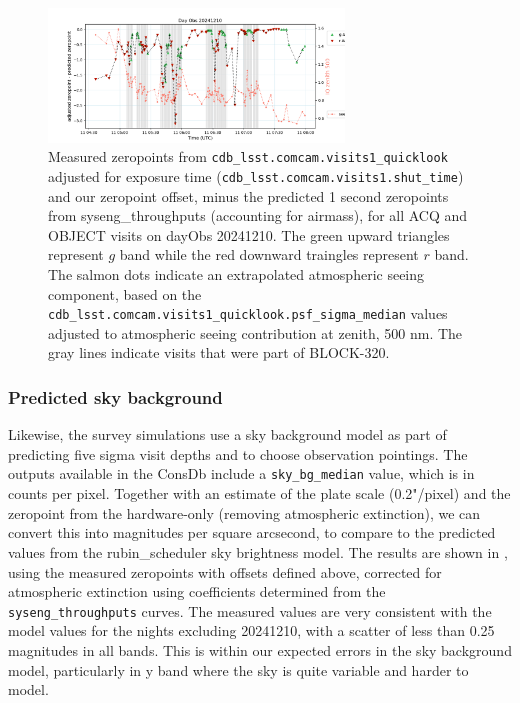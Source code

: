 \begin{figure}
    \centering
    \includegraphics[width=0.7\textwidth]{sp/zeropoints_dayobs_20241210.png}
    \caption{Measured zeropoints from \texttt{cdb\_lsst.comcam.visits1\_quicklook} adjusted for exposure time (\texttt{cdb\_lsst.comcam.visits1.shut\_time}) and our zeropoint offset, minus the predicted 1 second zeropoints from syseng\_throughputs (accounting for airmass), for all ACQ and OBJECT visits on dayObs 20241210. The green upward triangles represent $g$ band while the red downward traingles represent $r$ band. The salmon dots indicate an extrapolated atmospheric seeing component, based on the \texttt{cdb\_lsst.comcam.visits1\_quicklook.psf\_sigma\_median} values adjusted to atmospheric seeing contribution at zenith, 500 nm. The gray lines indicate visits that were part of BLOCK-320. }
    \label{fig:zeropoints_dayobs_20241210}
    \end{figure}


\subsubsection{Predicted sky background}

Likewise, the survey simulations use a sky background model as part of predicting five sigma visit depths and to choose observation pointings. The outputs available in the ConsDb include a \texttt{sky\_bg\_median} value, which is in counts per pixel. Together with an estimate of the plate scale (0.2"/pixel) and the zeropoint from the hardware-only (removing atmospheric extinction), we can convert this into magnitudes per square arcsecond, to compare to the predicted values from the rubin\_scheduler sky brightness model. The results are shown in , using the measured zeropoints with offsets defined above, corrected for atmospheric extinction using coefficients determined from the \texttt{syseng\_throughputs} curves. The measured values are very consistent with the model values for the nights excluding 20241210, with a scatter of less than 0.25 magnitudes in all bands. This is within our expected errors in the sky background model, particularly in y band where the sky is quite variable and harder to model.

